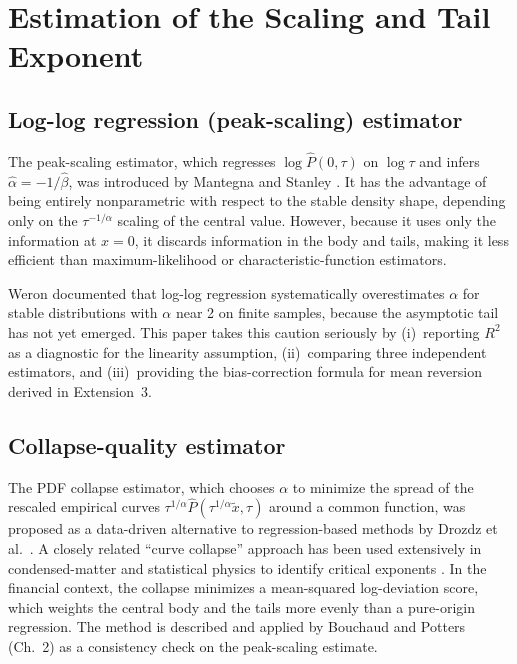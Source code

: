 \documentclass[12pt,a4paper]{article}
\begin{document}
\section{Estimation of the Scaling and Tail Exponent}
\label{sec:estimation}

\subsection{Log-log regression (peak-scaling) estimator}

The peak-scaling estimator, which regresses $\log\widehat{P}(0,\tau)$ on
$\log\tau$ and infers $\hat\alpha = -1/\hat\beta$, was introduced by
Mantegna and Stanley \cite{MantegnaStanley1994}. It has the advantage of being entirely
nonparametric with respect to the stable density shape, depending only on the
$\tau^{-1/\alpha}$ scaling of the central value. However, because it uses only
the information at $x = 0$, it discards information in the body and tails,
making it less efficient than maximum-likelihood or characteristic-function
estimators.

Weron \cite{Weron2001} documented that log-log regression systematically
overestimates $\alpha$ for stable distributions with $\alpha$ near 2 on finite
samples, because the asymptotic tail has not yet emerged. This paper takes this
caution seriously by (i)~reporting $R^2$ as a diagnostic for the linearity
assumption, (ii)~comparing three independent estimators, and (iii)~providing
the bias-correction formula for mean reversion derived in Extension~3.

\subsection{Collapse-quality estimator}

The PDF collapse estimator, which chooses $\alpha$ to minimize the spread of the
rescaled empirical curves $\tau^{1/\alpha}\widehat{P}(\tau^{1/\alpha}\tilde{x},\tau)$
around a common function, was proposed as a data-driven alternative to
regression-based methods by Drozdz et al.\ \cite{Drozdz2003}. A closely related
``curve collapse'' approach has been used extensively in condensed-matter and
statistical physics to identify critical exponents \cite{Houdayer2004}.
In the financial context, the collapse minimizes a mean-squared log-deviation
score, which weights the central body and the tails more evenly than a
pure-origin regression. The method is described and applied by
Bouchaud and Potters \cite{BouchaudPotters2003} (Ch.~2) as a consistency check on the
peak-scaling estimate.
\end{document}
